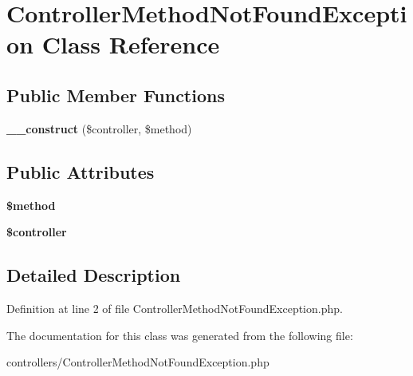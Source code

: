 \hypertarget{class_controller_method_not_found_exception}{
\section{ControllerMethodNotFoundException Class Reference}
\label{class_controller_method_not_found_exception}
}
\subsection*{Public Member Functions}
\begin{DoxyCompactItemize}
\item 
\hypertarget{class_controller_method_not_found_exception_adb21f0651fa58bb9f6daf5ab942164e3}{
{\bfseries \_\-\_\-construct} (\$controller, \$method)}
\label{class_controller_method_not_found_exception_adb21f0651fa58bb9f6daf5ab942164e3}

\end{DoxyCompactItemize}
\subsection*{Public Attributes}
\begin{DoxyCompactItemize}
\item 
\hypertarget{class_controller_method_not_found_exception_aa31052607fc83ec79370634afc8d3d78}{
{\bfseries \$method}}
\label{class_controller_method_not_found_exception_aa31052607fc83ec79370634afc8d3d78}

\item 
\hypertarget{class_controller_method_not_found_exception_a1cba3dcb8784a501ce371f6dea340d51}{
{\bfseries \$controller}}
\label{class_controller_method_not_found_exception_a1cba3dcb8784a501ce371f6dea340d51}

\end{DoxyCompactItemize}


\subsection{Detailed Description}


Definition at line 2 of file ControllerMethodNotFoundException.php.



The documentation for this class was generated from the following file:\begin{DoxyCompactItemize}
\item 
controllers/ControllerMethodNotFoundException.php\end{DoxyCompactItemize}
